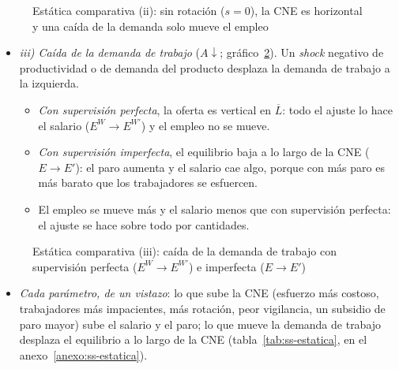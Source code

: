 \documentclass[11pt]{article}
\begin{document}
\begin{figure}[H]
\centering
\caption{Estática comparativa (ii): sin rotación ($s=0$), la CNE es horizontal y una caída de la demanda solo mueve el empleo}\label{fig:shapiro-stiglitz-sin-rotacion}
\end{figure}

\begin{itemize}
\item \emph{iii) Caída de la demanda de trabajo} ($A\downarrow$; gráfico~\ref{fig:shapiro-stiglitz-demanda}). Un \emph{shock} negativo de productividad o de demanda del producto desplaza la demanda de trabajo a la izquierda.
  \begin{itemize}
  \item \emph{Con supervisión perfecta}, la oferta es vertical en $\overline{L}$: todo el ajuste lo hace el salario ($E^W\to E^{W\prime}$) y el empleo no se mueve.
  \item \emph{Con supervisión imperfecta}, el equilibrio baja a lo largo de la CNE ($E\to E'$): el paro aumenta y el salario cae algo, porque con más paro es más barato que los trabajadores se esfuercen.
  \item El empleo se mueve más y el salario menos que con supervisión perfecta: el ajuste se hace sobre todo por cantidades.
  \end{itemize}
\end{itemize}

\begin{figure}[H]
\centering
\caption{Estática comparativa (iii): caída de la demanda de trabajo con supervisión perfecta ($E^W\to E^{W\prime}$) e imperfecta ($E\to E'$)}\label{fig:shapiro-stiglitz-demanda}
\end{figure}

\begin{itemize}
\item \emph{Cada parámetro, de un vistazo}: lo que sube la CNE (esfuerzo más costoso, trabajadores más impacientes, más rotación, peor vigilancia, un subsidio de paro mayor) sube el salario y el paro; lo que mueve la demanda de trabajo desplaza el equilibrio a lo largo de la CNE (tabla~\ref{tab:ss-estatica}, en el anexo~\ref{anexo:ss-estatica}).
\end{itemize}
\end{document}
